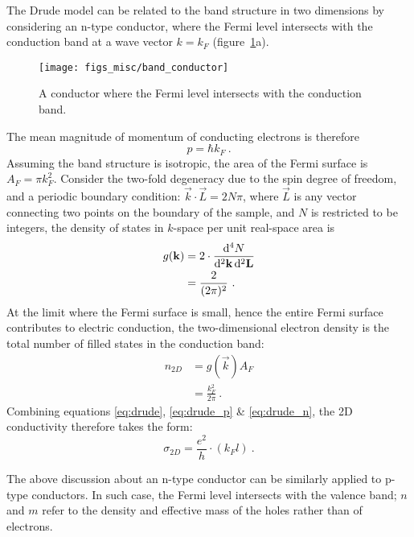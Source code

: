 The Drude model can be related to the band structure in two dimensions by considering an n-type conductor, where the Fermi level intersects with the conduction band at a wave vector $k = k_F$ (figure~\ref{fig:band_conductor}a). %
\begin{figure}[ht]%
    \centering%
    \texttt{[image: figs\_misc/band\_conductor]}%
    \caption[Band structure of an n-type conductor]{\label{fig:band_conductor}A conductor where the Fermi level intersects with the conduction band.}%
\end{figure}%
%
The mean magnitude of momentum of conducting electrons is therefore
\begin{equation}
    p = \hbar k_F~.\label{eq:drude_p}
\end{equation}%
Assuming the band structure is isotropic, the area of the Fermi surface is $A_F = \pi k_F^2$. Consider the two-fold degeneracy due to the spin degree of freedom, and a periodic boundary condition: $\vec{k} \cdot \vec{L} = 2N\pi$, where $\vec{L}$ is any vector connecting two points on the boundary of the sample, and $N$ is restricted to be integers, the density of states in $k$-space per unit real-space area is%
\begin{align}
    g(\mathbf{k}) &= 2\cdot\frac{\mathop{}\!\mathrm{d}^4N}{\mathop{}\!\mathrm{d}^2 \mathbf{k} \mathop{}\!\mathrm{d}^2 \mathbf{L}}\nonumber\\
        & = \frac{2}{(2\pi)^2}~.
\end{align}%
At the limit where the Fermi surface is small, hence the entire Fermi surface contributes to electric conduction, the two-dimensional electron density is the total number of filled states in the conduction band:%
\begin{align}
    n_{2D} &= g(\vec{k}) A_F\nonumber\\
        &= \frac{k_F^2}{2\pi}~.\label{eq:drude_n}
\end{align}%
Combining equations \ref{eq:drude}, \ref{eq:drude_p} \& \ref{eq:drude_n}, the 2D conductivity therefore takes the form:
\begin{equation}
    \sigma_{2D} = \frac{e^2}{h} \cdot (k_F l)~.\label{eq:drude_2d}
\end{equation}%

The above discussion about an n-type conductor can be similarly applied to p-type conductors. In such case, the Fermi level intersects with the valence band; $n$ and $m$ refer to the density and effective mass of the holes rather than of electrons.

